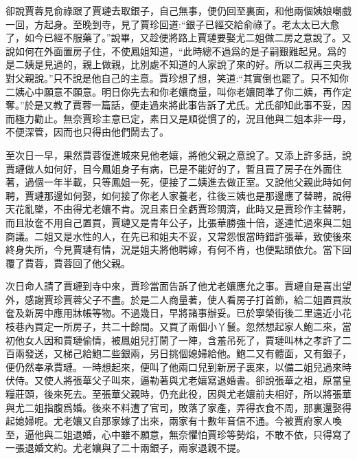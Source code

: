 \begin{parag}
    卻說賈蓉見俞祿跟了賈璉去取銀子，自己無事，便仍回至裏面，和他兩個姨娘嘲戲一回，方起身。至晚到寺，見了賈珍回道:“銀子已經交給俞祿了。老太太已大愈了，如今已經不服藥了。”說畢，又趁便將路上賈璉要娶尤二姐做二房之意說了。又說如何在外面置房子住，不使鳳姐知道，“此時總不過爲的是子嗣艱難起見。爲的是二姨是見過的，親上做親，比別處不知道的人家說了來的好。所以二叔再三央我對父親說。”只不說是他自己的主意。賈珍想了想，笑道:“其實倒也罷了。只不知你二姨心中願意不願意。明日你先去和你老孃商量，叫你老孃問準了你二姨，再作定奪。”於是又教了賈蓉一篇話，便走過來將此事告訴了尤氏。尤氏卻知此事不妥，因而極力勸止。無奈賈珍主意已定，素日又是順從慣了的，況且他與二姐本非一母，不便深管，因而也只得由他們鬧去了。
\end{parag}


\begin{parag}
    至次日一早，果然賈蓉復進城來見他老孃，將他父親之意說了。又添上許多話，說賈璉做人如何好，目今鳳姐身子有病，已是不能好的了，暫且買了房子在外面住著，過個一年半載，只等鳳姐一死，便接了二姨進去做正室。又說他父親此時如何聘，賈璉那邊如何娶，如何接了你老人家養老，往後三姨也是那邊應了替聘，說得天花亂墜，不由得尤老孃不肯。況且素日全虧賈珍賙濟，此時又是賈珍作主替聘，而且妝奩不用自己置買，賈璉又是青年公子，比張華勝強十倍，遂連忙過來與二姐商議。二姐又是水性的人，在先已和姐夫不妥，又常怨恨當時錯許張華，致使後來終身失所，今見賈璉有情，況是姐夫將他聘嫁，有何不肯，也便點頭依允。當下回覆了賈蓉，賈蓉回了他父親。
\end{parag}


\begin{parag}
    次日命人請了賈璉到寺中來，賈珍當面告訴了他尤老孃應允之事。賈璉自是喜出望外，感謝賈珍賈蓉父子不盡。於是二人商量著，使人看房子打首飾，給二姐置買妝奩及新房中應用牀帳等物。不過幾日，早將諸事辦妥。已於寧榮街後二里遠近小花枝巷內買定一所房子，共二十餘間。又買了兩個小丫鬟。忽然想起家人鮑二來，當初他女人因和賈璉偷情，被鳳姐兒打鬧了一陣，含羞吊死了，賈璉叫林之孝許了二百兩發送，又梯己給鮑二些銀兩，另日挑個媳婦給他。鮑二又有體面，又有銀子，便仍然奉承賈璉。一時想起來，便叫了他兩口兒到新房子裏來，以備二姐兒過來時伏侍。又使人將張華父子叫來，逼勒著與尤老孃寫退婚書。卻說張華之祖，原當皇糧莊頭，後來死去。至張華父親時，仍充此役，因與尤老孃前夫相好，所以將張華與尤二姐指腹爲婚。後來不料遭了官司，敗落了家產，弄得衣食不周，那裏還娶得起媳婦呢。尤老孃又自那家嫁了出來，兩家有十數年音信不通。今被賈府家人喚至，逼他與二姐退婚，心中雖不願意，無奈懼怕賈珍等勢焰，不敢不依，只得寫了一張退婚文約。尤老孃與了二十兩銀子，兩家退親不提。
\end{parag}


